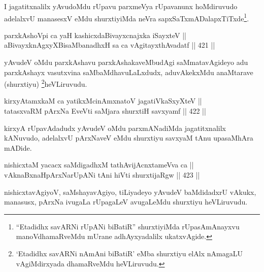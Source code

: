 \begin{artha}
I jagatitxnalilx yAvudoMdu rUpavu parxmeVya rUpavanunx hoMdiruvudo
adelalxvU manasesxV eMdu shurxtiyiMda neVra sapxSaTxmADalapxTiTxde\footnote{``Etadidhx savARNi rUpANi biBatiR'' shurxtiyiMda rUpasAmAnayxvu manoVdhamaRveMdu mUrane adhAyxyadalilx ukatxvAgide.}.
\end{artha}

\begin{shl}
parxkAshoV\s pi ca yaH kashicxdaBivayxcnajxka iSayxteV || \\
aBivayxknAgxyXBisaMbanadhxH sa ca vAgitayxthAvadatf \hfill || 421 ||  
\end{shl}

\begin{artha}
yAvudeV oMdu parxkAshavu parxkAshakaveMbudAgi saMmatavAgideyo adu
parxkAshayx vasutxvina saMbaMdhavuLaLxdudx, aduvAkekxMdu anaMtarave
(shurxtiyu) \footnote{`Etadidhx savARNi nAmAni biBatiR' eMba shurxtiyu elAlx nAmagaLU
vAgiMdirxyada dhamaRveMdu heVLiruvudu.}heVLiruvudu.
\end{artha}

\begin{shl}
kirxyAtamxkaM ca yatikxMcinAmxnatoV jagatiVkaSxyXteV || \\
tatasxvaRM pArxNa EveVti saMjara shurxtiH savxyamf \hfill || 422 ||  
\end{shl}

\begin{artha}
kirxyA rUpavAdadudx yAvudeV oMdu parxmANadiMda jagatitxnalilx
kANuvudo, adelalxvU pArxNaveV eMdu shurxtiyu savxyaM tAnu upasaMhAra
mADide.
\end{artha}

\begin{shl}
\footnotemark[3]nishicxtaM yacacx saMdigadhxM tathA\s vijAcnxtameVva ca || \\
vAknaBxnaHpArxNarUpANi tAni hiVti shurxtijaRgw \hfill || 423 ||  
\end{shl}

\begin{artha}
nishicxtavAgiyoV, saMshayavAgiyo, tiLiyadeyo yAvudeV baMdidadxrU vAkukx, manasusx, pArxNa ivugaLa rUpagaLeV avugaLeMdu shurxtiyu heVLiruvudu.
\end{artha}

